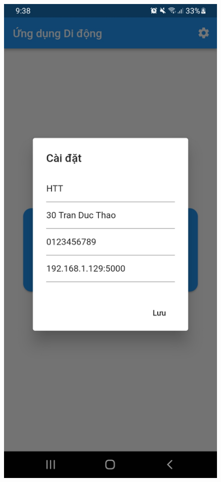 \documentclass[a4paper,14pt]{extarticle}
\begin{document}
\begin{figure}[H]
		\includegraphics[scale=0.1]{images/screenshot2.jpg}

\end{figure}
\end{document}
